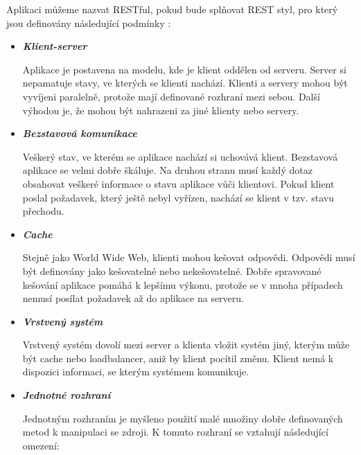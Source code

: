 \documentclass[11pt,twoside,a4paper]{book}
\begin{document}
Aplikaci můžeme nazvat RESTful, pokud bude splňovat REST styl, pro který jsou
definovány následující podmínky \cite{Burke14}:

\begin{itemize}
  \item \textbf{\textit{Klient-server}}

Aplikace je postavena na modelu, kde je klient oddělen od serveru. Server si
nepamatuje stavy, ve kterých se klienti nachází. Klienti a servery mohou být
vyvíjeni paralelně, protože mají definované rozhraní mezi sebou. Další výhodou
je, že mohou být nahrazeni za jiné klienty nebo servery.

\item \textbf{\textit{Bezstavová komunikace}}

Veškerý stav, ve kterém se aplikace nachází si uchovává klient. Bezstavová aplikace se velmi
dobře škáluje. Na druhou stranu musí každý dotaz obsahovat veškeré informace o stavu
aplikace vůči klientovi. Pokud klient poslal požadavek, který ještě nebyl vyřízen, nachází se
klient v tzv. stavu přechodu.

\item \textbf{\textit{Cache}}

Stejně jako World Wide Web, klienti mohou kešovat odpovědi. Odpovědi musí být
definovány jako kešovatelné nebo nekešovatelné. Dobře spravované kešování aplikace
pomáhá k lepšímu výkonu, protože se v mnoha případech nemusí posílat požadavek až do
aplikace na serveru.

\item \textbf{\textit{Vrstvený systém}}

Vrstvený systém dovolí mezi server a klienta vložit systém jiný, kterým může být cache nebo
loadbalancer, aniž by klient pocítil změnu. Klient nemá k dispozici informaci, se kterým
systémem komunikuje.

\item \textbf{\textit{Jednotné rozhraní}}

Jednotným rozhraním je myšleno použití malé množiny dobře definovaných metod k
manipulaci se zdroji. K tomuto rozhraní se vztahují následující omezení:


\end{itemize}
\end{document}
